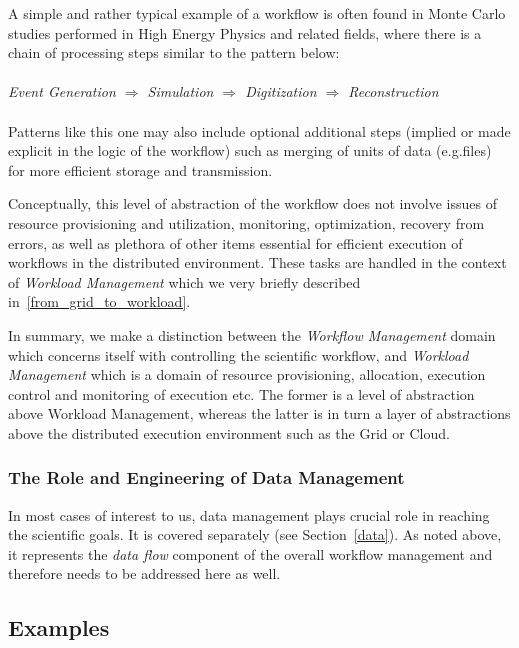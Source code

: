 A simple and rather typical example of a workflow is often found in Monte Carlo studies performed in High Energy Physics and related fields, where there is a chain of processing steps similar to the pattern below:
\\
\\
\textit{Event  Generation $\Longrightarrow$ Simulation $\Longrightarrow$ Digitization $\Longrightarrow$ Reconstruction}
\\
\\
Patterns like this one may also include optional additional steps (implied or made explicit in the logic of the workflow) such as merging of units of data (e.g.files) for more efficient storage and transmission.

Conceptually, this level of abstraction of the workflow does not  involve issues of resource provisioning and utilization, monitoring, optimization, recovery from errors, as well as plethora of other items essential
for efficient execution of workflows in the distributed environment. These tasks are handled in the context of \textit{Workload Management} which we very briefly described in~\ref{from_grid_to_workload}.

In summary, we make a distinction between the \textit{Workflow Management} domain which concerns itself with controlling the scientific workflow, and \textit{Workload Management} which
is a domain of resource provisioning, allocation, execution control and monitoring of execution etc. The former is a level of abstraction above Workload Management, whereas the latter is in
turn a layer of abstractions above the distributed execution environment such as the Grid or Cloud.


\subsubsection{The Role and Engineering of Data Management}
In most cases of interest to us, data management plays crucial role in reaching the scientific goals. It is covered separately (see Section~\ref{data}).
As noted above, it represents the \textit{data flow} component of the overall workflow management and therefore needs to be addressed here as well.




\subsection{Examples}
\label{wms_examples}
